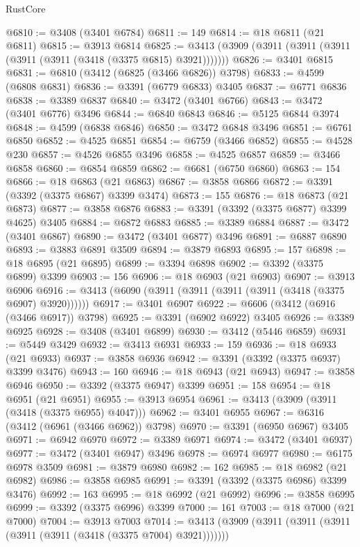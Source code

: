 \begin{lexlean}{RustCore}
\begin{coremodule}
@6810 := @3408 (@3401 @6784)
@6811 := 149
@6814 := @18 @6811 (@21 @6811)
@6815 := @3913 @6814
@6825 := @3413 (@3909 (@3911 (@3911 (@3911 (@3911 (@3911 (@3418 (@3375 @6815) @3921)))))))
@6826 := @3401 @6815
@6831 := @6810 (@3412 (@6825 (@3466 @6826)) @3798)
@6833 := @4599 (@6808 @6831)
@6836 := @3391 (@6779 @6833) @3405
@6837 := @6771 @6836
@6838 := @3389 @6837
@6840 := @3472 (@3401 @6766)
@6843 := @3472 (@3401 @6776) @3496
@6844 := @6840 @6843
@6846 := @5125 @6844 @3974
@6848 := @4599 (@6838 @6846)
@6850 := @3472 @6848 @3496
@6851 := @6761 @6850
@6852 := @4525 @6851
@6854 := @6759 (@3466 @6852)
@6855 := @4528 @230
@6857 := @4526 @6855 @3496
@6858 := @4525 @6857
@6859 := @3466 @6858
@6860 := @6854 @6859
@6862 := @6681 (@6750 @6860)
@6863 := 154
@6866 := @18 @6863 (@21 @6863)
@6867 := @3858 @6866
@6872 := @3391 (@3392 (@3375 @6867) @3399 @3474)
@6873 := 155
@6876 := @18 @6873 (@21 @6873)
@6877 := @3858 @6876
@6883 := @3391 (@3392 (@3375 @6877) @3399 @4625) @3405
@6884 := @6872 @6883
@6885 := @3389 @6884
@6887 := @3472 (@3401 @6867)
@6890 := @3472 (@3401 @6877) @3496
@6891 := @6887 @6890
@6893 := @3883 @6891 @3509
@6894 := @3879 @6893
@6895 := 157
@6898 := @18 @6895 (@21 @6895)
@6899 := @3394 @6898
@6902 := @3392 (@3375 @6899) @3399
@6903 := 156
@6906 := @18 @6903 (@21 @6903)
@6907 := @3913 @6906
@6916 := @3413 (@6090 (@3911 (@3911 (@3911 (@3911 (@3418 (@3375 @6907) @3920))))))
@6917 := @3401 @6907
@6922 := @6606 (@3412 (@6916 (@3466 @6917)) @3798)
@6925 := @3391 (@6902 @6922) @3405
@6926 := @3389 @6925
@6928 := @3408 (@3401 @6899)
@6930 := @3412 (@5446 @6859)
@6931 := @5449 @3429
@6932 := @3413 @6931
@6933 := 159
@6936 := @18 @6933 (@21 @6933)
@6937 := @3858 @6936
@6942 := @3391 (@3392 (@3375 @6937) @3399 @3476)
@6943 := 160
@6946 := @18 @6943 (@21 @6943)
@6947 := @3858 @6946
@6950 := @3392 (@3375 @6947) @3399
@6951 := 158
@6954 := @18 @6951 (@21 @6951)
@6955 := @3913 @6954
@6961 := @3413 (@3909 (@3911 (@3418 (@3375 @6955) @4047)))
@6962 := @3401 @6955
@6967 := @6316 (@3412 (@6961 (@3466 @6962)) @3798)
@6970 := @3391 (@6950 @6967) @3405
@6971 := @6942 @6970
@6972 := @3389 @6971
@6974 := @3472 (@3401 @6937)
@6977 := @3472 (@3401 @6947) @3496
@6978 := @6974 @6977
@6980 := @6175 @6978 @3509
@6981 := @3879 @6980
@6982 := 162
@6985 := @18 @6982 (@21 @6982)
@6986 := @3858 @6985
@6991 := @3391 (@3392 (@3375 @6986) @3399 @3476)
@6992 := 163
@6995 := @18 @6992 (@21 @6992)
@6996 := @3858 @6995
@6999 := @3392 (@3375 @6996) @3399
@7000 := 161
@7003 := @18 @7000 (@21 @7000)
@7004 := @3913 @7003
@7014 := @3413 (@3909 (@3911 (@3911 (@3911 (@3911 (@3911 (@3418 (@3375 @7004) @3921)))))))

\end{coremodule}
\end{lexlean}
